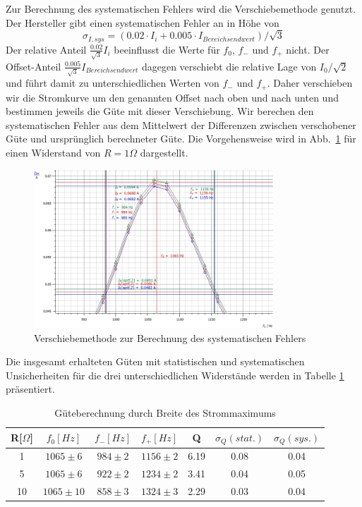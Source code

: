 \documentclass[12pt,a4paper]{article}
\begin{document}
Zur Berechnung des systematischen Fehlers wird die Verschiebemethode genutzt. Der Hersteller gibt einen systematischen Fehler an in Höhe von
\begin{equation}
\sigma_{I,sys}=(0.02\cdot I_i+0.005\cdot I_{Bereichsendwert})/\sqrt{3}
\end{equation}
Der relative Anteil $\frac{0.02}{\sqrt{3}}I_i$ beeinflusst die Werte für $f_0$, $f_-$ und $f_+$ nicht. Der Offset-Anteil $\frac{0.005}{\sqrt{3}}I_{Bereichsendwert}$ dagegen verschiebt die relative Lage von $I_0/\sqrt{2}$ und führt damit zu unterschiedlichen Werten von $f_-$ und $f_+$. Daher verschieben wir die Stromkurve um den genannten Offset nach oben und nach unten und bestimmen jeweils die Güte mit dieser Verschiebung. Wir berechen den systematischen Fehler aus dem Mittelwert der Differenzen zwischen verschobener Güte und ursprünglich berechneter Güte. Die Vorgehensweise wird in Abb.~\ref{S1Ohm_f0_sys} für einen Widerstand von $R=1\Omega$ dargestellt.
\begin{figure}[H]
	\centering
	\includegraphics[width=0.8\textwidth]{Daten/S1Ohm_f0_sys.jpg}
	\caption{Verschiebemethode zur Berechnung des systematischen Fehlers}
	\label{S1Ohm_f0_sys}
\end{figure}
Die insgesamt erhalteten Güten mit statistischen und systematischen Unsicherheiten für die drei unterschiedlichen Widerstände werden in Tabelle \ref{table:S_f0} präsentiert.
\begin{table}[H]
	\centering
	\begin{tabular}{|c|c|c|c|c|c|c|}
		\hline
		R[$\Omega$]&$f_0[Hz]$&$f_-[Hz]$&$f_+[Hz]$&Q&$\sigma_Q(stat.)$&$\sigma_Q(sys.)$\\
		\hline
		1&$1065\pm6$&$984\pm2$&$1156\pm2$&6.19&0.08&0.04\\
		5&$1065\pm6$&$922\pm2$&$1234\pm2$&3.41&0.04&0.05\\
		10&$1065\pm10$&$858\pm3$&$1324\pm3$&2.29&0.03&0.04\\
		\hline		
	\end{tabular}
	\caption{Güteberechnung durch Breite des Strommaximums}
	\label{table:S_f0}
\end{table}
\end{document}
